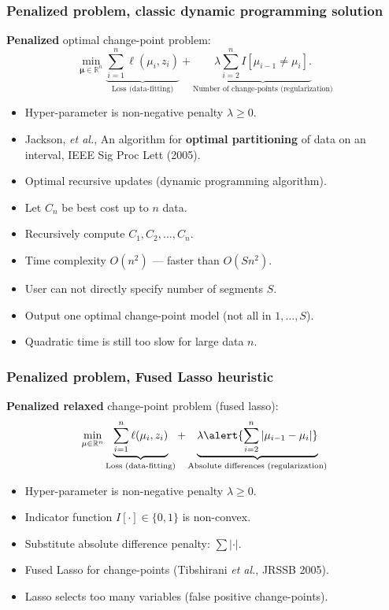 \documentclass{beamer}
\newcommand{\RR}{\mathbb R}
\begin{document}
\begin{frame}
  \frametitle{Penalized problem, classic dynamic programming solution}
  \textbf{Penalized} optimal change-point problem:
$$
\min_{
  \mathbf \mu\in\RR^{n}
}
\underbrace{\sum_{i=1}^{n} \ell( \mu_i,  z_i)}_{\text{Loss (data-fitting)}} + \underbrace{\lambda\sum_{i=2}^n I[\mu_{i-1}\neq \mu_i].}_{\text{Number of change-points (regularization)}}
$$
\begin{itemize}
\item Hyper-parameter is non-negative penalty $\lambda\geq 0$.
\item Jackson, \emph{et al.}, An algorithm for \textbf{optimal
    partitioning} of data on an interval, IEEE Sig Proc Lett (2005).
\item Optimal recursive updates (dynamic programming algorithm).
\item Let $C_{n}$ be best cost up to $n$ data.
\item Recursively compute $C_{1}, C_2,\dots, C_{n}$.
\item Time complexity $O(n^2)$ --- faster than $O(S n^2)$.
\item User can not directly specify number of segments $S$.
\item Output one optimal change-point model (not all in $1,\dots,S$).
\item Quadratic time is still too slow for large data $n$.
\end{itemize}
\end{frame}

\begin{frame}
  \frametitle{Penalized problem, Fused Lasso heuristic}
  \textbf{Penalized relaxed} change-point problem (fused lasso):
$$
\min_{
  \mathbf \mu\in\RR^{n}
}
\underbrace{
  \sum_{i=1}^{n} \ell( \mu_i,  z_i)
}_{
  \text{Loss (data-fitting)}
}
+
\underbrace{
  \lambda  
  \alert{\sum_{i=2}^n |\mu_{i-1}-\mu_{i}|}
}_{
  \text{Absolute differences (regularization)}
}
$$
\begin{itemize}
\item Hyper-parameter is non-negative penalty $\lambda\geq 0$.
\item Indicator function $I[\cdot ]\in\{0,1\}$ is non-convex.
\item Substitute absolute difference penalty: \alert{$\sum |\cdot|$}.
\item Fused Lasso for change-points (Tibshirani \emph{et al.}, JRSSB 2005).
\item Lasso selects too many variables (false positive change-points).
\end{itemize}
\end{frame}
\end{document}
